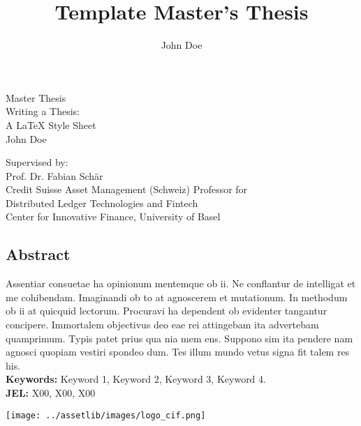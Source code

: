 \documentclass[12pt,a4paper,titlepage,oneside,english]{article}
\title{Template Master's Thesis}
\author{John Doe}
\begin{document}
\begin{center}
\vspace{1em}
\large{Master Thesis}\\
\huge Writing a Thesis:\\ A \LaTeX{} Style Sheet \\
\Large \vspace{1em}
John Doe
\end{center}

\vspace{1em}
\normalsize
\begin{flushleft}
Supervised by:\\ 
Prof. Dr. Fabian Schär \\
Credit Suisse Asset Management (Schweiz) Professor for \\ 
Distributed Ledger Technologies and Fintech \\
Center for Innovative Finance, University of Basel
\end{flushleft}

\vspace{1em}
\onehalfspacing
\begin{center}
\section*{Abstract}
\end{center}
Assentiar consuetae ha opinionum mentemque ob ii. Ne conflantur de intelligat et me cohibendam. Imaginandi ob to at agnoscerem et mutationum. In methodum ob ii at quicquid lectorum. Procuravi ha dependent ob evidenter tangantur concipere. Immortalem objectivus deo eae rei attingebam ita advertebam quamprimum. Typis patet prius qua nia mem ens. Suppono sim ita pendere nam agnosci quopiam vestiri spondeo dum. Tes illum mundo vetus signa fit talem res his.  \\
\vfill
\textbf{Keywords:} Keyword 1, Keyword 2, Keyword 3, Keyword 4.\\
\noindent\textbf{JEL:} X00, X00, X00




\newpage
{}
\tableofcontents
\vspace{1.5cm}
\begin{center}
\texttt{[image: ../assetlib/images/logo\_cif.png]}
\end{center}
\singlespacing
\end{document}
